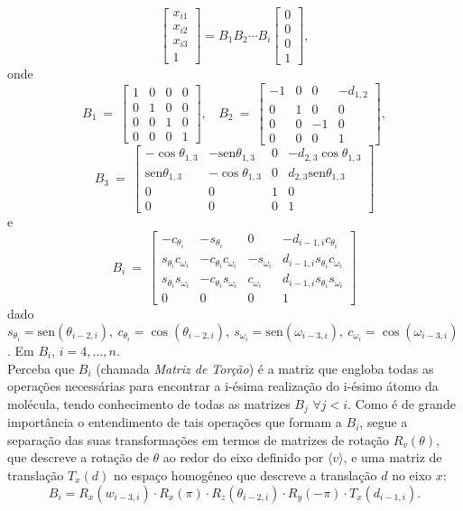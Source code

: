 $$
\begin{bmatrix}
	x_{i1}\\ 
	x_{i2}\\ 
	x_{i3}\\ 
	1
\end{bmatrix}
= B_{1}B_{2}\cdots B_{i}\begin{bmatrix}
	0\\ 
	0\\ 
	0\\ 
	1
\end{bmatrix},
$$
onde
$$
B_1\: =\:
\begin{bmatrix}
	1 & 0 & 0 & 0\\ 
	0 & 1 & 0 & 0\\ 
	0 & 0 & 1 & 0\\ 
	0 & 0 & 0 & 1
\end{bmatrix},\:\:\:
\: B_2\: =\:
\begin{bmatrix}
	-1 & 0 & 0 & -d_{1,2}\\
	0 & 1 & 0 & 0\\ 
	0 & 0 & -1 & 0\\ 
	0 & 0 & 0 & 1
\end{bmatrix},
$$
$$
B_3\:=\:
\begin{bmatrix}
	-\cos\theta_{1,3} & -\mbox{sen}\theta_{1,3} & 0 & -d_{2,3}\cos\theta_{1,3}\\ 
	\mbox{sen}\theta_{1,3} & -\cos\theta_{1,3} & 0 & d_{2,3}\mbox{sen}\theta_{1,3}\\ 
	0 & 0 & 1 & 0\\ 
	0 & 0 & 0 & 1
\end{bmatrix}
$$
e
$$
B_i\:=\:
\begin{bmatrix}
	-c_{\theta_{i}} & -s_{\theta_{i}} & 0 & -d_{i-1,i}c_{\theta_{i}}\\ 
	s_{\theta_{i}}c_{\omega_{i}} & -c_{\theta_{i}}c_{\omega_{i}}
	& -s_{\omega_{i}} & d_{i-1,i}s_{\theta_{i}}c_{\omega_{i}}\\ 
	s_{\theta_{i}}s_{\omega_{i}} & -c_{\theta_{i}}s_{\omega_{i}} & c_{\omega_{i}} & d_{i-1,i}s_{\theta_{i}}s_{\omega_{i}}\\ 
	0 & 0 & 0 & 1
\end{bmatrix}
$$
dado $s_{\theta_{i}}=\mbox{sen} (\theta_{i-2, i}),\: c_{\theta_{i}}=\cos (\theta_{i-2, i}),\: s_{\omega_{i}}=\mbox{sen} (\omega_{i-3, i}),\: c_{\omega_{i}}=\cos (\omega_{i-3, i})$. Em $B_i$, $i=4, ..., n$.
\\

Perceba que $B_i$ (chamada \textit{Matriz de Torção}) é a matriz que engloba todas as operações necessárias para encontrar a i-ésima realização do i-ésimo átomo da molécula, tendo conhecimento de todas as matrizes $B_j$ $\forall j < i$. Como é de grande importância o entendimento de tais operações que formam a $B_i$, segue a separação das suas transformações em termos de matrizes de rotação $R_v(\theta)$, que descreve a rotação de $\theta$ ao redor do eixo definido por $\langle v\rangle$, e uma matriz de translação $T_x(d)$ no espaço homogêneo que descreve a translação $d$ no eixo $x$:
$$
B_i=R_{x}(w_{i-3,i})\cdot R_{x}(\pi)\cdot R_{z}(\theta_{i-2,i})\cdot R_{y}(-\pi)\cdot T_{x}(d_{i-1,i}).
$$

